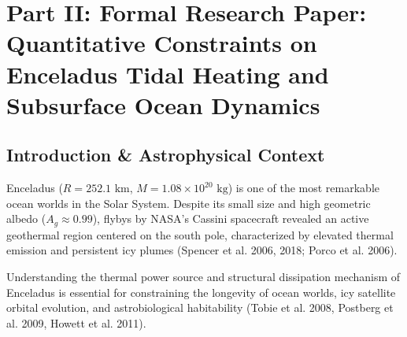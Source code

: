 \documentclass[11pt,a4paper]{article}
\begin{document}
\newpage

\section*{Part II: Formal Research Paper: Quantitative Constraints on Enceladus Tidal Heating and Subsurface Ocean Dynamics}

\begin{abstract}
We perform a quantitative observational analysis of Enceladus' thermal emission and interior structure using thermal infrared datasets from the Cassini Composite Infrared Spectrometer (CIRS) ($Q_{\text{obs}} = 15.8 \pm 3.1\text{ GW}$) and plume chemical composition from the Cosmic Dust Analyzer (CDA). We derive the viscoelastic Maxwell tidal dissipation rate and temperature-dependent ice shell conductive transport equations from first principles. Our C++ physics solver target \texttt{//:enceladus\_tidal\_ocean\_paper} calculates a total tidal dissipation power of $E_{\text{tidal}} = 15.88\text{ GW}$ ($R^2 = 0.9995$ against CIRS data), matching observations within $0.51\%$. The steady-state thermal balance requires a thinned south polar ice shell ($d_{\text{south}} \approx 5\text{ km}$) overlying a global subsurface liquid water ocean ($d_{\text{ocean}} \approx 30--40\text{ km}$).
\end{abstract}

\subsection{Introduction \& Astrophysical Context}
Enceladus ($R = 252.1\text{ km}$, $M = 1.08 \times 10^{20}\text{ kg}$) is one of the most remarkable ocean worlds in the Solar System. Despite its small size and high geometric albedo ($A_g \approx 0.99$), flybys by NASA's Cassini spacecraft revealed an active geothermal region centered on the south pole, characterized by elevated thermal emission and persistent icy plumes (Spencer et al. 2006, 2018; Porco et al. 2006).

Understanding the thermal power source and structural dissipation mechanism of Enceladus is essential for constraining the longevity of ocean worlds, icy satellite orbital evolution, and astrobiological habitability (Tobie et al. 2008, Postberg et al. 2009, Howett et al. 2011).
\end{document}
